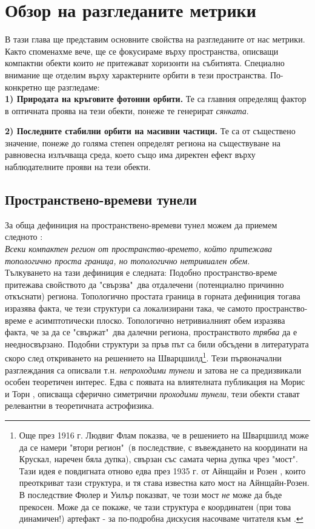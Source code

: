 \section{Обзор на разгледаните метрики}
В тази глава ще представим основните свойства на разгледаните от нас метрики. Както споменахме вече, ще се фокусираме върху пространства, описващи компактни обекти които \emph{не} притежават хоризонти на събитията. Специално внимание ще отделим върху характерните орбити в тези пространства. По-конкретно ще разгледаме:\\

\noindent\textbf{1) Природата на кръговите фотонни орбити.} Те са главния определящ фактор в оптичната проява на тези обекти, понеже те генерират \emph{сянката}.\newline

\noindent\textbf{2) Последните стабилни орбити на масивни частици.} Те са от съществено значение, понеже до голяма степен определят региона на съществуване на равновесна излъчваща среда, което също има директен ефект върху наблюдателните прояви на тези обекти.
 
\subsection{Пространствено-времеви тунели}
За обща дефиниция на пространствено-времеви тунел можем да приемем следното \cite{Visser1995LorentzianWF}:\\

\emph{Всеки компактен регион от пространство-времето, който притежава топологично проста граница, но топологично нетривиален обем.}\\\newline
Тълкуването на тази дефиниция е следната: Подобно пространство-време притежава свойството да "свързва"$\,$ два отдалечени (потенциално причинно откъснати) региона. Топологично простата граница в горната дефиниция тогава изразява факта, че тези структури са локализирани така, че самото пространство-време е асимптотически плоско. Топологично нетривиалният обем изразява факта, че за да се "свържат"$\,$ два далечни региона, пространството \emph{трябва} да е неедносвързано. Подобни структури за пръв път са били обсъдени в литературата скоро след откриването на решението на Шварцшилд\footnote{ Още през 1916 г. Людвиг Флам \cite{Flamm} показва, че в решението на Шварцшилд може да се намери "втори регион"$\,$ (в последствие, с въвеждането на координати на Крускал, наречен бяла дупка), свързан със самата черна дупка чрез "мост". Тази идея е повдигната отново едва през 1935 г. от Айнщайн и Розен \cite{Einstein1935}, които преоткриват тази структура, и тя става известна като мост на Айнщайн-Розен. В последствие Фюлер и Уилър \cite{Fuller} показват, че този мост \emph{не} може да бъде прекосен. Може да се покаже, че тази структура е координатен (при това динамичен!) артефакт - за по-подробна дискусия насочваме читателя към \cite{Collas2011}.}. Тези първоначални разглеждания са описвали т.н. \emph{непроходими тунели} и затова не са предизвикали особен теоретичен интерес. Едва с появата на влиятелната публикация на Морис и Торн \cite{Morris1988}, описваща сферично симетрични \emph{проходими тунели}, тези обекти стават релевантни в теоретичната астрофизика.\newpage

